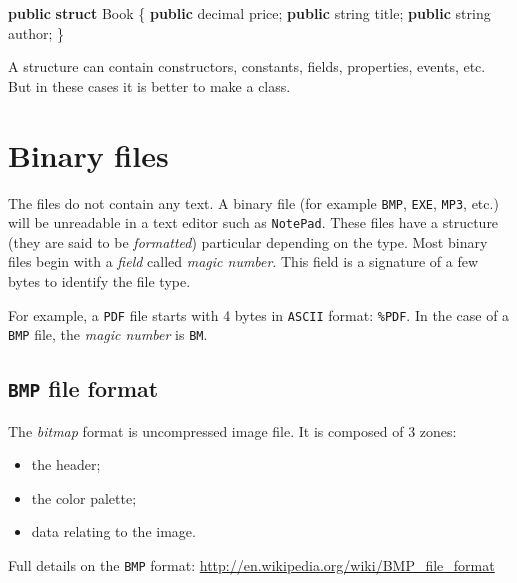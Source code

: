 \documentclass[11pt, a4paper]{article}
\newenvironment{Shaded}{}{}
\newcommand{\KeywordTok}[1]{\textcolor[rgb]{0.00,0.44,0.13}{\textbf{{#1}}}}
\newcommand{\DataTypeTok}[1]{\textcolor[rgb]{0.56,0.13,0.00}{{#1}}}
\newcommand{\NormalTok}[1]{{#1}}
\begin{document}
\begin{Shaded}
\begin{Highlighting}[]
\KeywordTok{public} \KeywordTok{struct} \NormalTok{Book}
\NormalTok{\{}
    \KeywordTok{public} \DataTypeTok{decimal} \NormalTok{price;}
    \KeywordTok{public} \DataTypeTok{string} \NormalTok{title;}
    \KeywordTok{public} \DataTypeTok{string} \NormalTok{author;}
\NormalTok{\}}
\end{Highlighting}
\end{Shaded}

A structure can contain constructors, constants, fields, properties,
events, etc. But in these cases it is better to make a class.
\section{Binary files}\label{binary-files}

The files do not contain any text. A binary file (for example
\texttt{BMP}, \texttt{EXE}, \texttt{MP3}, etc.) will be unreadable in a
text editor such as \texttt{NotePad}. These files have a structure (they
are said to be \emph{formatted}) particular depending on the type. Most
binary files begin with a \emph{field} called \emph{magic number}. This
field is a signature of a few bytes to identify the file type.

For example, a \texttt{PDF} file starts with 4 bytes in \texttt{ASCII}
format: \texttt{\%PDF}. In the case of a \texttt{BMP} file, the
\emph{magic number} is \texttt{BM}.

\subsection{\texttt{BMP} file format}\label{bmp-file-format}

The \emph{bitmap} format is uncompressed image file. It is composed of 3
zones:

\begin{itemize}
\itemsep1pt\parskip0pt
\item
  the header;
\item
  the color palette;
\item
  data relating to the image.\newline
\end{itemize}

Full details on the \texttt{BMP} format:
\url{http://en.wikipedia.org/wiki/BMP_file_format}
\end{document}
